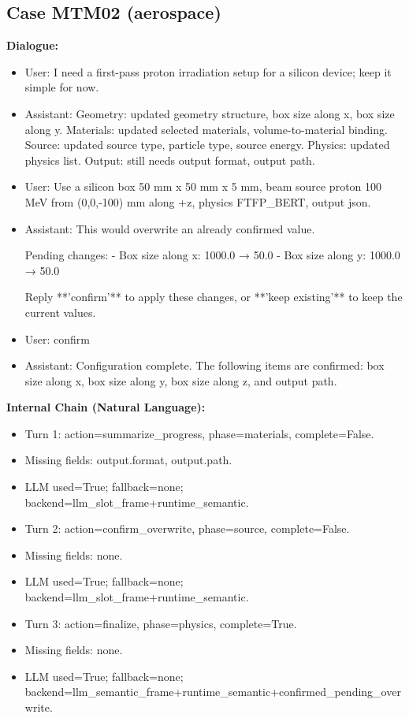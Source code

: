 \documentclass[11pt]{ctexart}
\begin{document}
\subsection{Case MTM02 (aerospace)}
\textbf{Dialogue:}
\begin{itemize}
\item User: I need a first-pass proton irradiation setup for a silicon device; keep it simple for now.
\item Assistant: Geometry: updated geometry structure, box size along x, box size along y. Materials: updated selected materials, volume-to-material binding. Source: updated source type, particle type, source energy. Physics: updated physics list. Output: still needs output format, output path.
\item User: Use a silicon box 50 mm x 50 mm x 5 mm, beam source proton 100 MeV from (0,0,-100) mm along +z, physics FTFP\_BERT, output json.
\item Assistant: This would overwrite an already confirmed value.

Pending changes:
- Box size along x: 1000.0 → 50.0
- Box size along y: 1000.0 → 50.0

Reply **'confirm'** to apply these changes, or **'keep existing'** to keep the current values.
\item User: confirm
\item Assistant: Configuration complete. The following items are confirmed: box size along x, box size along y, box size along z, and output path.
\end{itemize}
\textbf{Internal Chain (Natural Language):}
\begin{itemize}
\item Turn 1: action=summarize\_progress, phase=materials, complete=False.
\item Missing fields: output.format, output.path.
\item LLM used=True; fallback=none; backend=llm\_slot\_frame+runtime\_semantic.
\item Turn 2: action=confirm\_overwrite, phase=source, complete=False.
\item Missing fields: none.
\item LLM used=True; fallback=none; backend=llm\_slot\_frame+runtime\_semantic.
\item Turn 3: action=finalize, phase=physics, complete=True.
\item Missing fields: none.
\item LLM used=True; fallback=none; backend=llm\_semantic\_frame+runtime\_semantic+confirmed\_pending\_overwrite.
\end{itemize}
\end{document}
